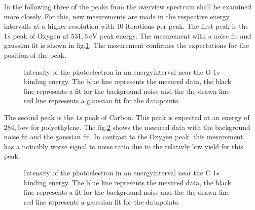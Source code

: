 \documentclass[numbers=noenddot,a4paper]{article}
\begin{document}
In the following three of the peaks from the overview spectrum shall be examined more closely. For this, new mesurements are made in the respective energy intervalls at a higher resolution with 10 iterations per peak. The first peak is the $1s$ peak of Oxygen at $531,6\,\mathrm{eV}$ peak energy. The mesurement with a noise fit and gaussian fit is shown in fig.\ref{fig:O2}. The mesurement confirmes the expectations for the position of the peak.\\

\begin{figure}[t]
	\centering
	\caption{Intensity of the photoelectron in an energyinterval near the O $1s$ binding energy. The blue line represents the mesured data, the black line represents a fit for the background noise and the  the drawn line red line represents a gaussian fit for the datapoints.}
	\label{fig:O2}
\end{figure}

The second peak is the $1s$ peak of Carbon. This peak is expected at an energy of $284,6\,\mathrm{ev}$ for polyethylene. The fig.\ref{fig:C1s} shows the mesured data with the background noise fit and the gaussian fit. In contrast to the Oxygen peak, this mesurement has a noticibly worse signal to noise ratio due to the relativly low yield for this peak.\\

\begin{figure}[!H]
	\centering
	\caption{Intensity of the photoelectron in an energyinterval near the C $1s$ binding energy. The blue line represents the mesured data, the black line represents a fit for the background noise and the  the drawn line red line represents a gaussian fit for the datapoints.}
	\label{fig:C1s}
\end{figure}
\end{document}
